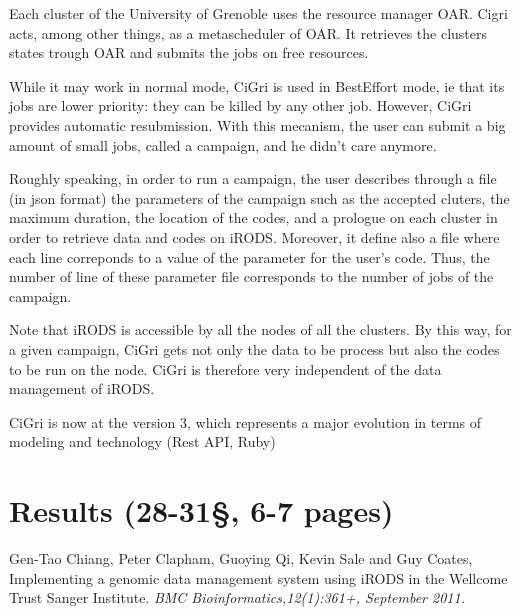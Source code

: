 \documentclass[a4paper, 10pt]{article}
\begin{document}
\begin{multicols}{2}
Each cluster of the University of Grenoble uses the resource manager OAR. Cigri acts, among other things, as a metascheduler of OAR.
It retrieves the clusters states trough OAR and submits the jobs on free resources.

While it may work in normal mode, CiGri is used in BestEffort mode, ie that its jobs are lower priority: they can 
be killed by any other job. However, CiGri provides automatic resubmission. With this mecanism, the user can submit 
a big amount of small jobs, called a campaign, and he didn't care anymore.


Roughly speaking, in order to run a campaign, the user describes through a file (in json format) the parameters of the campaign 
such as the accepted cluters, the maximum duration, the location of the codes, and a prologue on each cluster in order to 
retrieve data and codes on iRODS. Moreover, it define also a file where each line correponds to a value of the parameter for the user's code.
Thus, the number of line of these parameter file corresponds to the number of jobs of the campaign.

Note that iRODS is accessible by all the nodes of all the clusters. By this way, for a given campaign, CiGri gets not only
the data to be process but also the codes to be run on the node. CiGri is therefore very independent of the data management of iRODS.

CiGri is now at the version 3, which represents a major evolution in terms of modeling and technology (Rest API, Ruby)

\newpage
\section{Results (28-31\S, 6-7 pages)}


\begin{thebibliography}{9}
 Gen-Tao Chiang, Peter Clapham, Guoying Qi, Kevin Sale and Guy Coates,
 Implementing a genomic data management system using iRODS in the Wellcome Trust Sanger Institute.
{\em BMC Bioinformatics,12(1):361+, September 2011.}
\end{thebibliography}

\end{multicols}
\end{document}
